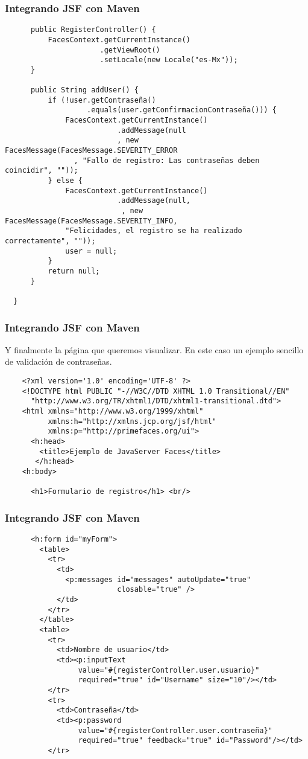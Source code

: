 \documentclass{beamer}
\begin{document}
\begin{frame}[fragile]
  \frametitle{Integrando JSF con Maven}
  \begin{verbatim}
      public RegisterController() {
          FacesContext.getCurrentInstance()
                      .getViewRoot()
                      .setLocale(new Locale("es-Mx"));
      }

      public String addUser() {
          if (!user.getContraseña()
                   .equals(user.getConfirmacionContraseña())) {
              FacesContext.getCurrentInstance()
                          .addMessage(null
                          , new FacesMessage(FacesMessage.SEVERITY_ERROR
                , "Fallo de registro: Las contraseñas deben coincidir", ""));
          } else {
              FacesContext.getCurrentInstance()
                          .addMessage(null,
                           , new FacesMessage(FacesMessage.SEVERITY_INFO,
              "Felicidades, el registro se ha realizado correctamente", ""));
              user = null;
          }
          return null;
      }

  }
  \end{verbatim}
\end{frame}

\begin{frame}[fragile]
  \frametitle{Integrando JSF con Maven}

  Y finalmente la página que queremos visualizar. En este caso un
  ejemplo sencillo de validación de contraseñas.

  \begin{verbatim}
    <?xml version='1.0' encoding='UTF-8' ?>
    <!DOCTYPE html PUBLIC "-//W3C//DTD XHTML 1.0 Transitional//EN"
      "http://www.w3.org/TR/xhtml1/DTD/xhtml1-transitional.dtd">
    <html xmlns="http://www.w3.org/1999/xhtml"
          xmlns:h="http://xmlns.jcp.org/jsf/html"
          xmlns:p="http://primefaces.org/ui">
      <h:head>
        <title>Ejemplo de JavaServer Faces</title>
       </h:head>
    <h:body>

      <h1>Formulario de registro</h1> <br/>
  \end{verbatim}
\end{frame}

\begin{frame}[fragile]
  \frametitle{Integrando JSF con Maven}
  \begin{verbatim}
      <h:form id="myForm">
        <table>
          <tr>
            <td>
              <p:messages id="messages" autoUpdate="true"
                          closable="true" />
            </td>
          </tr>
        </table>
        <table>
          <tr>
            <td>Nombre de usuario</td>
            <td><p:inputText
                 value="#{registerController.user.usuario}"
                 required="true" id="Username" size="10"/></td>
          </tr>
          <tr>
            <td>Contraseña</td>
            <td><p:password
                 value="#{registerController.user.contraseña}"
                 required="true" feedback="true" id="Password"/></td>
          </tr>
  \end{verbatim}
\end{frame}
\end{document}
